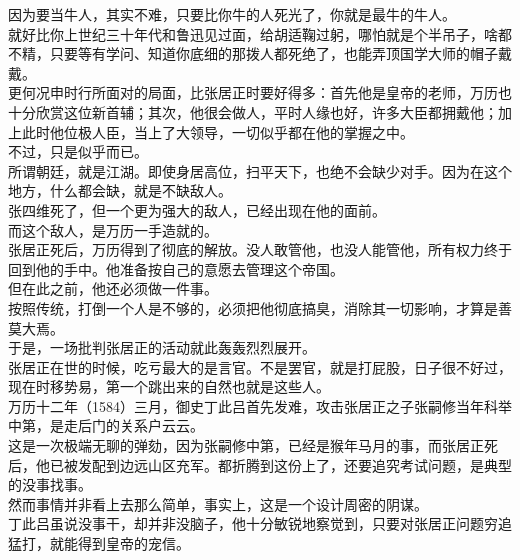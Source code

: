 \begin{multicols}{\theparacolNo}
因为要当牛人，其实不难，只要比你牛的人死光了，你就是最牛的牛人。\\

就好比你上世纪三十年代和鲁迅见过面，给胡适鞠过躬，哪怕就是个半吊子，啥都不精，只要等有学问、知道你底细的那拨人都死绝了，也能弄顶国学大师的帽子戴戴。\\

更何况申时行所面对的局面，比张居正时要好得多：首先他是皇帝的老师，万历也十分欣赏这位新首辅；其次，他很会做人，平时人缘也好，许多大臣都拥戴他；加上此时他位极人臣，当上了大领导，一切似乎都在他的掌握之中。\\

不过，只是似乎而已。\\

所谓朝廷，就是江湖。即使身居高位，扫平天下，也绝不会缺少对手。因为在这个地方，什么都会缺，就是不缺敌人。\\

张四维死了，但一个更为强大的敌人，已经出现在他的面前。\\

而这个敌人，是万历一手造就的。\\

张居正死后，万历得到了彻底的解放。没人敢管他，也没人能管他，所有权力终于回到他的手中。他准备按自己的意愿去管理这个帝国。\\

但在此之前，他还必须做一件事。\\

按照传统，打倒一个人是不够的，必须把他彻底搞臭，消除其一切影响，才算是善莫大焉。\\

于是，一场批判张居正的活动就此轰轰烈烈展开。\\

张居正在世的时候，吃亏最大的是言官。不是罢官，就是打屁股，日子很不好过，现在时移势易，第一个跳出来的自然也就是这些人。\\

万历十二年（1584）三月，御史丁此吕首先发难，攻击张居正之子张嗣修当年科举中第，是走后门的关系户云云。\\

这是一次极端无聊的弹劾，因为张嗣修中第，已经是猴年马月的事，而张居正死后，他已被发配到边远山区充军。都折腾到这份上了，还要追究考试问题，是典型的没事找事。\\

然而事情并非看上去那么简单，事实上，这是一个设计周密的阴谋。\\

丁此吕虽说没事干，却并非没脑子，他十分敏锐地察觉到，只要对张居正问题穷追猛打，就能得到皇帝的宠信。\\


\end{multicols}
